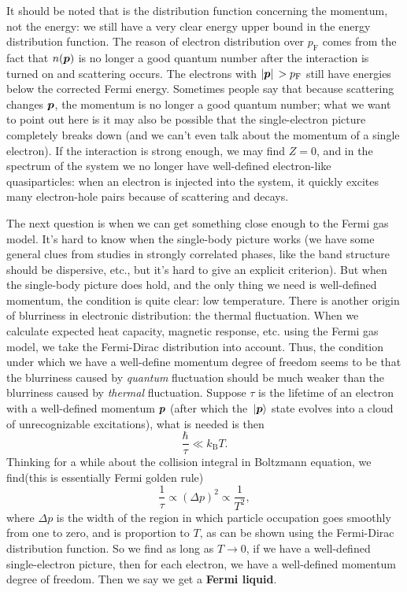 \documentclass[hyperref, a4paper]{article}
\newcommand*{\concept}[1]{{\textbf{#1}}}
\newcommand*{\kB}{k_{\text{B}}}
\newcommand*{\pfermi}{p_{\text{F}}}
\begin{document}
It should be noted that  
is the distribution function concerning the momentum, not the energy:
we still have a very clear energy upper bound 
in the energy distribution function.
The reason of electron distribution over $\pfermi$
comes from the fact that $n(\vb*{p})$ is no longer a good quantum number 
after the interaction is turned on
and scattering occurs.
The electrons with $\abs*{\vb*{p}} > \pfermi$ 
still have energies below the corrected Fermi energy.
Sometimes people say that because scattering changes $\vb*{p}$, 
the momentum is no longer a good quantum number; 
what we want to point out here 
is it may also be possible 
that the single-electron picture completely breaks down 
(and we can't even talk about the momentum of a single electron).
If the interaction is strong enough, 
we may find $Z = 0$, 
and in the spectrum of the system we no longer have 
well-defined electron-like quasiparticles:
when an electron is injected into the system, 
it quickly excites many electron-hole pairs 
because of scattering
and decays.

The next question is when we can get something close enough to the Fermi gas model.
It's hard to know when the single-body picture works 
(we have some general clues from studies in strongly correlated phases, 
like the band structure should be dispersive, etc., 
but it's hard to give an explicit criterion).
But when the single-body picture does hold, 
and the only thing we need is well-defined momentum, 
the condition is quite clear: 
low temperature.
There is another origin of blurriness in electronic distribution:
the thermal fluctuation.
When we calculate expected heat capacity, magnetic response, etc. 
using the Fermi gas model, 
we take the Fermi-Dirac distribution into account. 
Thus, the condition under which we have a well-define momentum degree of freedom 
seems to be that 
the blurriness caused by \emph{quantum} fluctuation 
should be much weaker than the blurriness caused by \emph{thermal} fluctuation.
Suppose $\tau$ is the lifetime of an electron with a well-defined momentum $\vb*{p}$
(after which the $\ket*{\vb*{p}}$ state evolves into 
a cloud of unrecognizable excitations), 
what is needed is then 
\begin{equation}
    \frac{\hbar}{\tau} \ll \kB T.
\end{equation}
Thinking for a while about the collision integral 
in Boltzmann equation, 
we find(this is essentially Fermi golden rule)
\begin{equation}
    \frac{1}{\tau} \propto (\Delta p)^2 \propto \frac{1}{T^2}, 
\end{equation}
where $\Delta p$ is the width 
of the region in which particle occupation goes smoothly from one to zero, 
and is proportion to $T$, 
as can be shown using the Fermi-Dirac distribution function.
So we find as long as $T \to 0$, 
if we have a well-defined single-electron picture,
then for each electron, we have a well-defined momentum degree of freedom.
Then we say we get a \concept{Fermi liquid}.
\end{document}
